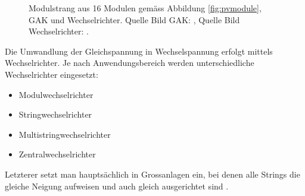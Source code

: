 \begin{figure}[h!t]
    \centering
    \caption{%
        Modulstrang aus 16 Modulen  gem\"ass Abbildung \ref{fig:pvmodule}, GAK
        und  Wechselrichter. Quelle Bild  GAK: \cite{ref:gak:gantner},  Quelle
        Bild Wechselrichter: \cite{ref:inverter:sunnyboy}.%
    }
    \label{fig:pvarray:gak:inverter}
\end{figure}

Die    Umwandlung    der    Gleichspannung    in    Wechselspannung    erfolgt
mittels  Wechselrichter. Je  nach  Anwendungsbereich  werden  unterschiedliche
Wechselrichter eingesetzt:

\begin{itemize}
    \firmlist
    \item
        Modulwechselrichter
    \item
        Stringwechselrichter
    \item
        Multistringwechselrichter
    \item
        Zentralwechselrichter
\end{itemize}

Letzterer  setzt  man haupts\"achlich  in  Grossanlagen  ein, bei  denen  alle
Strings  die  gleiche Neigung  aufweisen  und  auch gleich  ausgerichtet  sind
\cite{ref:pv:ratgeber}.

